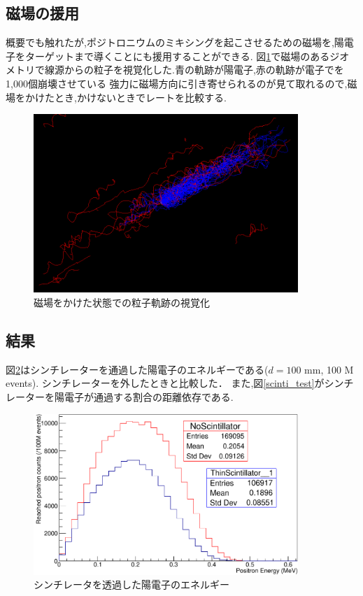 \subsection{磁場の援用}
概要でも触れたが,ポジトロニウムのミキシングを起こさせるための磁場を,陽電子をターゲットまで導くことにも援用することができる.
図\ref{mag_effect}で磁場のあるジオメトリで線源からの粒子を視覚化した.青の軌跡が陽電子,赤の軌跡が電子でを1,000個崩壊させている
強力に磁場方向に引き寄せられるのが見て取れるので,磁場をかけたとき,かけないときでレートを比較する.

\begin{figure}[htbp]
	\centering
		\includegraphics[width=10cm]{img/mag_effect.png}
	\caption{磁場をかけた状態での粒子軌跡の視覚化}
	\label{mag_effect}
\end{figure}


\subsection{結果}

図\ref{scinti_on_off}はシンチレーターを通過した陽電子のエネルギーである($d=100$ mm, 100 M events). シンチレーターを外したときと比較した．
また,図\ref{scinti_test}がシンチレーターを陽電子が通過する割合の距離依存である.

\begin{figure}[htbp]
	\centering
		\includegraphics[width=10cm]{fig/scinti_on_off.pdf}
	\caption{シンチレータを透過した陽電子のエネルギー}
	\label{scinti_on_off}
\end{figure}


